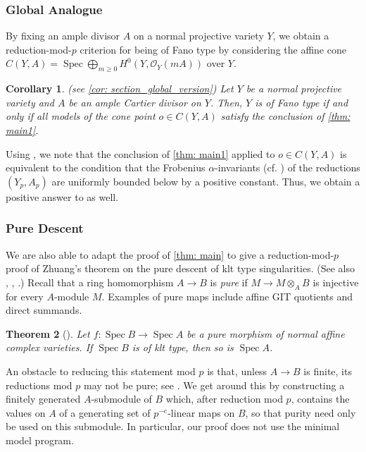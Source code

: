 \documentclass[11pt,leqno]{amsart}
\numberwithin{equation}{section}
\newtheorem{theorem}{Theorem}[section]
\newtheorem{corollary}[theorem]{Corollary}
\theoremstyle{definition}
\theoremstyle{remark}
\renewcommand{\O}{\mathcal{O}}
\newcommand{\Spec}{\operatorname{Spec}}
\begin{document}
\subsubsection*{Global Analogue} By fixing an ample divisor $A$ on a normal projective variety $Y$, we obtain a reduction-mod-$p$ criterion for being of Fano type by considering the affine cone $C(Y, A) = \Spec \bigoplus_{m \geq 0} H^0(Y, \O_Y(mA))$ over $Y$. 

\begin{corollary} (see \cref{cor: section_global_version}) \label{cor: global_version}
Let $Y$ be a normal projective variety and $A$ be an ample Cartier divisor on $Y$. Then, $Y$ is of Fano type if and only if all models of the cone point $o \in C(Y, A)$ satisfy the conclusion of \cref{thm: main1}.
\end{corollary}




Using \cite[Lemma 3.7]{lp26}, we note that the conclusion of \cref{thm: main1} applied to $o \in C(Y, A)$ is equivalent to the condition that the Frobenius $\alpha$-invariants (cf. \cite{pande2025frobeniusversiontiansalphainvariant})  of the reductions $(Y_p, A_p)$ are uniformly bounded below by a positive constant. Thus, we obtain a positive answer to \cite[Conjecture 1.2]{lp26} as well. 

\subsubsection*{Pure Descent} We are also able to adapt the proof of \cref{thm: main} to give a reduction-mod-$p$ proof of Zhuang's theorem \cite[Theorem 1.1]{zhuang24} on the pure descent of klt type singularities. (See also \cite[Theorem B]{Schoutens05}, \cite[Theorem 1]{BGLM24}, \cite[Theorem 1.3]{TY25}.) Recall that a ring homomorphism $A \to B$ is \textit{pure} if $M \to M \otimes_A B$ is injective for every $A$-module $M$. Examples of pure maps include affine GIT quotients and direct summands. 


\begin{theorem}[{\cite[Theorem 1.1]{zhuang24}}] \label{thm: puredescent}
Let $f: \Spec B \to \Spec A$ be a pure morphism of normal affine complex varieties. If $\Spec B$ is of klt type, then so is $\Spec A$.
\end{theorem}

An obstacle to reducing this statement mod $p$ is that, unless $A \to B$ is finite, its reductions mod $p$ may not be pure; see \cite{HJSP23}. We get around this by constructing a finitely generated $A$-submodule of $B$ which, after reduction mod $p$, contains the values on $A$ of a generating set of $p^{-e}$-linear maps on $B$, so that purity need only be used on this submodule. In particular, our proof does not use the minimal model program.
\end{document}
